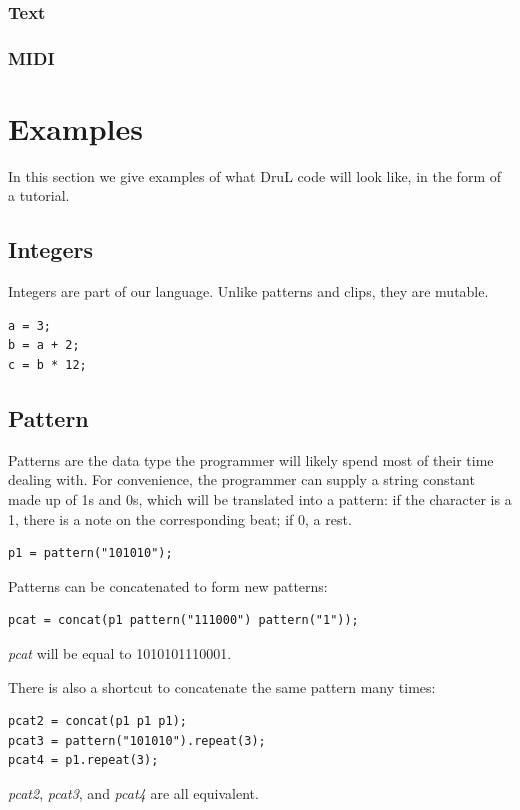 \documentclass[11pt,twoside]{article}
\begin{document}
\subsubsection{Text}

\subsubsection{MIDI}

\section{Examples}
In this section we give examples of what DruL code will look like, in the form
of a tutorial.

\subsection{Integers}
Integers are part of our language. Unlike patterns and clips, they are mutable.
\begin{verbatim}
a = 3;
b = a + 2;
c = b * 12;
\end{verbatim}

\subsection{Pattern}
Patterns are the data type the programmer will likely spend most of their time dealing with.  For convenience, the programmer can supply a string constant made up of 1s and 0s, which will be translated into a pattern: if the character is a 1, there is a note on the corresponding beat; if 0, a rest.
\begin{verbatim}
p1 = pattern("101010");
\end{verbatim}
Patterns can be concatenated to form new patterns:
\begin{verbatim}
pcat = concat(p1 pattern("111000") pattern("1"));
\end{verbatim}
\textit{pcat} will be equal to 1010101110001.

There is also a shortcut to concatenate the same pattern many times:
\begin{verbatim}
pcat2 = concat(p1 p1 p1);
pcat3 = pattern("101010").repeat(3);
pcat4 = p1.repeat(3);
\end{verbatim}
\textit{pcat2}, \textit{pcat3}, and \textit{pcat4} are all equivalent.
\end{document}
